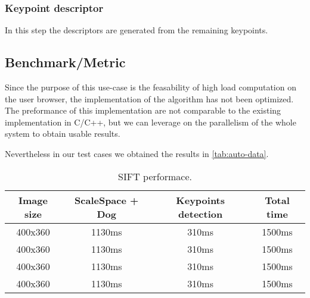 \subsubsection{Keypoint descriptor}
In this step the descriptors are generated from the remaining keypoints.


\subsection{Benchmark/Metric}
Since the purpose of this use-case is the feasability of high load computation
on the user browser, the implementation of the algorithm has not been optimized.
The preformance of this implementation are not comparable to the existing
implementation in C/C++, but we can leverage on the parallelism of the whole
system to obtain usable results.

Nevertheless in our test cases we obtained the results in \autoref{tab:auto-data}.
\begin{table}[htb]
    \caption{\acs{SIFT} performace.}
    \label{tab:auto-data}
    \centering
    \begin{tabular}{c|c|c|c}
        \textbf{Image size} & \textbf{ScaleSpace + Dog} & \textbf{Keypoints
        detection} & \textbf{Total time}\\
        \hline
        400x360 & 1130ms & 310ms & 1500ms\\
        \hline
        400x360 & 1130ms & 310ms & 1500ms\\
        \hline
        400x360 & 1130ms & 310ms & 1500ms\\
        \hline
        400x360 & 1130ms & 310ms & 1500ms\\
        \hline
    \end{tabular}
\end{table}
